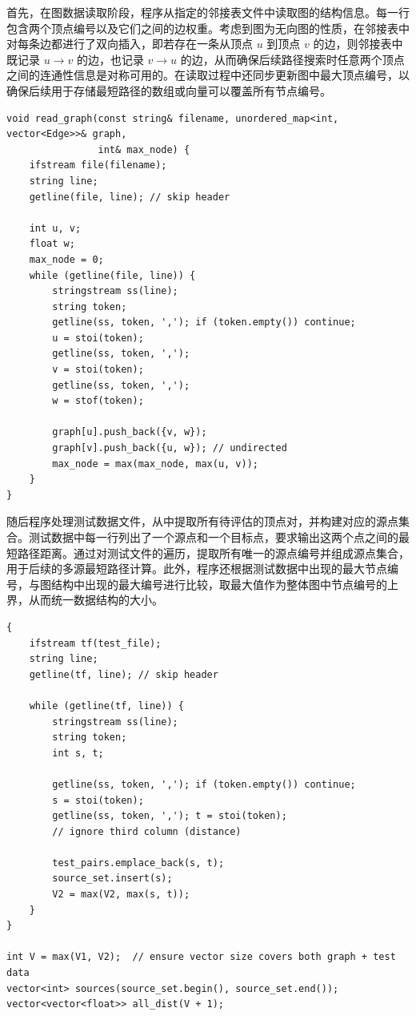 \documentclass[a4paper, utf8]{ctexart}
\begin{document}
	首先，在图数据读取阶段，程序从指定的邻接表文件中读取图的结构信息。每一行包含两个顶点编号以及它们之间的边权重。考虑到图为无向图的性质，在邻接表中对每条边都进行了双向插入，即若存在一条从顶点 $u$ 到顶点 $v$ 的边，则邻接表中既记录 $u \rightarrow v$ 的边，也记录 $v \rightarrow u$ 的边，从而确保后续路径搜索时任意两个顶点之间的连通性信息是对称可用的。在读取过程中还同步更新图中最大顶点编号，以确保后续用于存储最短路径的数组或向量可以覆盖所有节点编号。
	
	\begin{verbatim}
void read_graph(const string& filename, unordered_map<int, vector<Edge>>& graph,
                int& max_node) {
    ifstream file(filename);
    string line;
    getline(file, line); // skip header

    int u, v;
    float w;
    max_node = 0;
    while (getline(file, line)) {
        stringstream ss(line);
        string token;
        getline(ss, token, ','); if (token.empty()) continue;
        u = stoi(token);
        getline(ss, token, ',');
        v = stoi(token);
        getline(ss, token, ',');
        w = stof(token);

        graph[u].push_back({v, w});
        graph[v].push_back({u, w}); // undirected
        max_node = max(max_node, max(u, v));
    }
}
	\end{verbatim}
	
	随后程序处理测试数据文件，从中提取所有待评估的顶点对，并构建对应的源点集合。测试数据中每一行列出了一个源点和一个目标点，要求输出这两个点之间的最短路径距离。通过对测试文件的遍历，提取所有唯一的源点编号并组成源点集合，用于后续的多源最短路径计算。此外，程序还根据测试数据中出现的最大节点编号，与图结构中出现的最大编号进行比较，取最大值作为整体图中节点编号的上界，从而统一数据结构的大小。
	
	\begin{verbatim}
{
    ifstream tf(test_file);
    string line;
    getline(tf, line); // skip header

    while (getline(tf, line)) {
        stringstream ss(line);
        string token;
        int s, t;

        getline(ss, token, ','); if (token.empty()) continue;
        s = stoi(token);
        getline(ss, token, ','); t = stoi(token);
        // ignore third column (distance)

        test_pairs.emplace_back(s, t);
        source_set.insert(s);
        V2 = max(V2, max(s, t));
    }
}
    
int V = max(V1, V2);  // ensure vector size covers both graph + test data
vector<int> sources(source_set.begin(), source_set.end());
vector<vector<float>> all_dist(V + 1);
	\end{verbatim}
	
\end{document}
